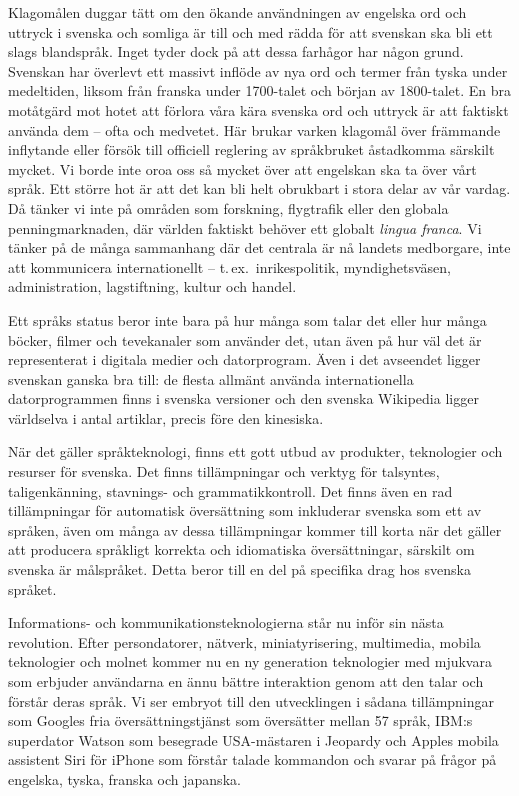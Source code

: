 \begin{multicols}{2}
Klagomålen duggar tätt om den ökande användningen av engelska ord och
uttryck i svenska och somliga är till och med rädda för att svenskan
ska bli ett slags blandspråk. Inget tyder dock på att \mbox{dessa} farhågor
har någon grund. Svenskan har överlevt ett massivt inflöde av nya ord
och termer från tyska \mbox{under} medel\-tiden, liksom från franska under
1700-talet och början av 1800-talet. En bra motåtgärd mot hotet att
förlora våra kära svenska ord och uttryck är att faktiskt använda dem
-- ofta och medvetet. Här brukar varken klagomål över främmande
in\-flyt\-ande eller försök till officiell reglering av språk\-bruket
åstadkomma särskilt mycket. Vi \mbox{borde} inte oroa oss så mycket över att
engelskan ska ta över vårt språk. Ett större hot är att det kan bli
helt obrukbart i \mbox{stora} delar av vår vardag. Då \mbox{tänker} vi inte på
områden som forskning, flygtrafik \mbox{eller} den globala penningmarknaden,
där världen fakt\-iskt be\-höver ett globalt \emph{lingua franca}. Vi tänker på
de många samman\-hang där det centrala är nå land\-ets med\-borg\-are, inte
att kommunicera inter\-nation\-ellt -- t.\,ex.~inrikes\-politik,
myndighets\-väsen, admin\-istra\-tion, lag\-stiftning, \mbox{kultur} och handel.

Ett språks status beror inte bara på hur många som talar det eller hur
många böcker, filmer och tevekanaler som använder det, utan även på
hur väl det är representerat i digitala medier och dator\-program. Även
i det avseendet ligger svenskan \mbox{ganska} bra till: de flesta allmänt
använda internationella dator\-programmen finns i svenska versioner och
den svenska Wikipedia ligger världselva i antal artiklar, precis före
den kinesiska.

När det gäller språkteknologi, finns ett gott utbud av produkter,
teknologier och resurser för svenska. Det finns tillämpningar och
verktyg för talsyntes, tal\-igen\-känn\-ing, stavnings- och
grammatikkontroll. Det finns även en rad tillämpningar för automatisk
översättning som inkluderar svenska som ett av språken, även om många
av dessa tillämpningar kommer till korta när det gäller att producera
språkligt korrekta och idiomatiska översättningar, särskilt om \mbox{svenska}
är målspråket. Detta beror till en del på specifika drag hos svenska
språket.

Informations- och kommunikationsteknologierna står nu inför sin nästa
revolution. Efter person\-datorer, nätverk, miniatyrisering, multimedia,
\mbox{mobila} teknologier och molnet kommer nu en ny generation teknologier
med mjukvara som er\-bjud\-er användarna en ännu bättre interaktion genom
att den talar och förstår deras språk. Vi ser embryot till den
utvecklingen i sådana tillämpningar som \mbox{Googles} fria
översättningstjänst som översätter \mbox{mellan} 57 språk, IBM:s superdator
Watson som besegrade USA-mästaren i Jeopardy och Apples mobila
assist\-ent Siri för iPhone som förstår talade kommandon och svarar på
frågor på engelska, tyska, franska och japanska.


\end{multicols}

